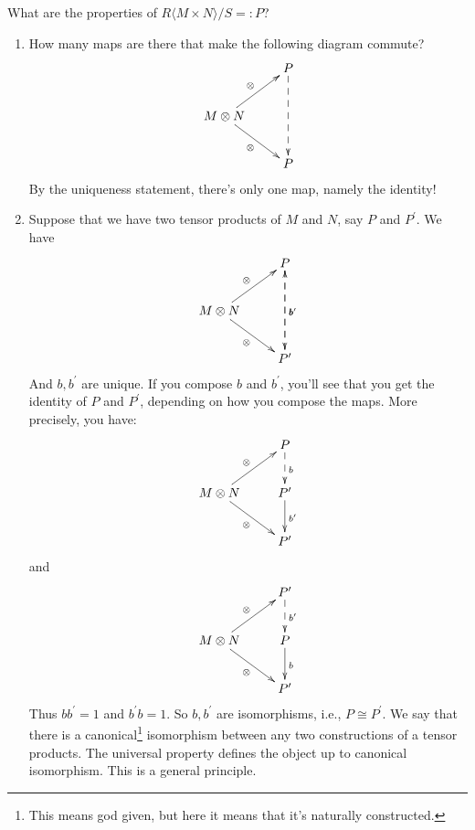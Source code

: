 \documentclass{amsart}
\theoremstyle{theorem}
\theoremstyle{definition}
\begin{document}
What are the properties of $R\langle M\times N\rangle/S=:P$?
\begin{enumerate}
\item How many maps are there that make the following diagram commute?
\begin{equation*}
\xymatrix{& P\ar@{-->}[dd]\\
M\otimes N\ar[ur]^\otimes\ar[dr]_\otimes & \\
& P}
\end{equation*}
By the uniqueness statement, there's only one map, namely the identity!
\item Suppose that we have two tensor products of $M$ and $N$, say $P$ and $P^\prime$. We have
\begin{equation*}
\xymatrix{& P\ar@{-->}[dd]^b\\
M\otimes N\ar[ur]^\otimes\ar[dr]_\otimes & \\
& P^\prime\ar@{-->}[uu]_{b^\prime}}
\end{equation*}
And $b,b^\prime$ are unique. If you compose $b$ and $b^\prime$, you'll see that you get the identity of $P$ and $P^\prime$, depending on how you compose the maps. More precisely, you have:
\begin{equation*}
\xymatrix{& P\ar@{-->}[d]^b\\
M\otimes N\ar[ur]^\otimes\ar[dr]_\otimes & P^\prime\ar[d]^{b^\prime}\\
& P^\prime}
\end{equation*}
and
\begin{equation*}
\xymatrix{& P^\prime\ar@{-->}[d]^{b^\prime}\\
M\otimes N\ar[ur]^\otimes\ar[dr]_\otimes & P\ar[d]^{b}\\
& P^\prime}
\end{equation*}
Thus $bb^\prime=1$ and $b^\prime b=1$. So $b,b^\prime$ are isomorphisms, i.e., $P\cong P^\prime$. We say that there is a canonical\footnote{This means god given, but here it means that it's naturally constructed.} isomorphism between any two constructions of a tensor products. The universal property defines the object up to canonical isomorphism. This is a general principle.


\end{enumerate}
\end{document}
